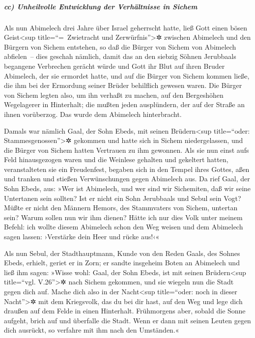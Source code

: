 \hypertarget{cc-unheilvolle-entwicklung-der-verhuxe4ltnisse-in-sichem}{%
\subparagraph{cc) Unheilvolle Entwicklung der Verhältnisse in
Sichem}\label{cc-unheilvolle-entwicklung-der-verhuxe4ltnisse-in-sichem}}

Als nun Abimelech drei Jahre über Israel geherrscht
hatte, ließ Gott einen bösen Geist\textless sup
title=``=~Zwietracht und Zerwürfnis''\textgreater✲ zwischen Abimelech
und den Bürgern von Sichem entstehen, so daß die Bürger von Sichem von
Abimelech abfielen~-- dies geschah nämlich, damit das an
den siebzig Söhnen Jerubbaals begangene Verbrechen gerächt würde und
Gott ihr Blut auf ihren Bruder Abimelech, der sie ermordet hatte, und
auf die Bürger von Sichem kommen ließe, die ihm bei der Ermordung seiner
Brüder behilflich gewesen waren. Die Bürger von Sichem
legten also, um ihn verhaßt zu machen, auf den Bergeshöhen Wegelagerer
in Hinterhalt; die mußten jeden ausplündern, der auf der Straße an ihnen
vorüberzog. Das wurde dem Abimelech hinterbracht.

Damals war nämlich Gaal, der Sohn Ebeds, mit seinen
Brüdern\textless sup title=``oder: Stammesgenossen''\textgreater✲
gekommen und hatte sich in Sichem niedergelassen, und die Bürger von
Sichem hatten Vertrauen zu ihm gewonnen. Als sie nun
einst aufs Feld hinausgezogen waren und die Weinlese gehalten und
gekeltert hatten, veranstalteten sie ein Freudenfest, begaben sich in
den Tempel ihres Gottes, aßen und tranken und stießen Verwünschungen
gegen Abimelech aus. Da rief Gaal, der Sohn Ebeds, aus:
»Wer ist Abimelech, und wer sind wir Sichemiten, daß wir seine
Untertanen sein sollten? Ist er nicht ein Sohn Jerubbaals und Sebul sein
Vogt? Müßte er nicht den Männern Hemors, des Stammvaters von Sichem,
untertan sein? Warum sollen nun wir ihm dienen? Hätte ich
nur dies Volk unter meinem Befehl: ich wollte diesem Abimelech schon den
Weg weisen und dem Abimelech sagen lassen: ›Verstärke dein Heer und
rücke aus!‹«

Als nun Sebul, der Stadthauptmann, Kunde von den Reden
Gaals, des Sohnes Ebeds, erhielt, geriet er in Zorn; er
sandte insgeheim Boten an Abimelech und ließ ihm sagen: »Wisse wohl:
Gaal, der Sohn Ebeds, ist mit seinen Brüdern\textless sup title=``vgl.
V.26''\textgreater✲ nach Sichem gekommen, und sie wiegeln nun die Stadt
gegen dich auf. Mache dich also in der Nacht\textless sup
title=``oder: noch in dieser Nacht''\textgreater✲ mit dem Kriegsvolk,
das du bei dir hast, auf den Weg und lege dich draußen auf dem Felde in
einen Hinterhalt. Frühmorgens aber, sobald die Sonne
aufgeht, brich auf und überfalle die Stadt. Wenn er dann mit seinen
Leuten gegen dich ausrückt, so verfahre mit ihm nach den Umständen.«

